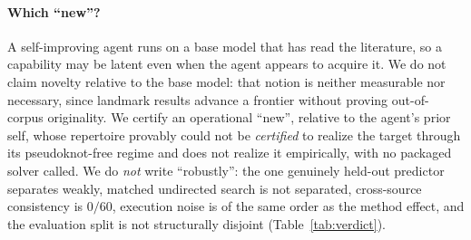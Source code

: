 \documentclass[11pt]{article}
\begin{document}
\paragraph{Which ``new''?} A self-improving agent runs on a base model that has read the literature, so a
capability may be latent even when the agent appears to acquire it. We do not claim novelty relative to the
base model: that notion is neither measurable nor necessary, since landmark results advance a frontier without
proving out-of-corpus originality. We certify an operational ``new'', relative to the agent's prior self,
whose repertoire provably could not be \emph{certified} to realize the target through its pseudoknot-free
regime and does not realize it empirically, with no packaged solver called. We do \emph{not} write
``robustly'': the one genuinely held-out predictor separates weakly, matched undirected search is not
separated, cross-source consistency is $0/60$, execution noise is of the same order as the method effect, and
the evaluation split is not structurally disjoint (Table~\ref{tab:verdict}).
\end{document}
